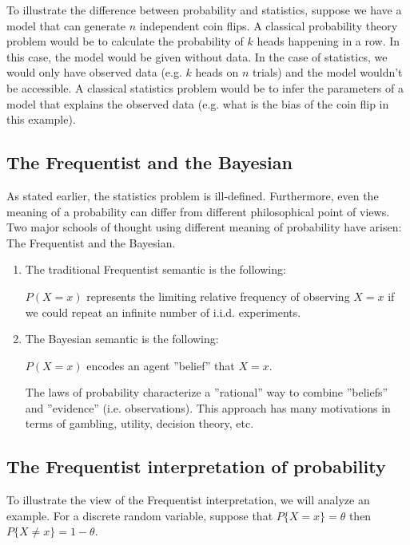 \documentclass[12pt]{report}
\renewcommand{\emph}[1]{\color{violet}#1\color{black}{}}
\begin{document}
To illustrate the difference between probability and statistics, suppose we have a model that can generate $ n $ independent coin flips. A classical probability theory problem would be to calculate the probability of $ k $ heads happening in a row. In this case, the model would be given without data. In the case of statistics, we would only have observed data (e.g. $ k $ heads on $ n $ trials) and the model wouldn't be accessible. A classical statistics problem would be to infer the parameters of a model that explains the observed data (e.g. what is the bias of the coin flip in this example).

\subsection{The Frequentist and the Bayesian}
As stated earlier, the statistics problem is ill-defined. Furthermore, even the meaning of a probability can differ from different philosophical point of views. Two major schools of thought using different meaning of probability have arisen: The Frequentist and the Bayesian.

\begin{enumerate}

  \item The \emph{traditional Frequentist} semantic is the following: 

$ P(X = x) $ represents the limiting relative frequency of observing $ X = x $ if we could repeat an infinite number of i.i.d. experiments.

  \item The \emph{Bayesian semantic} is the following:

$ P(X = x) $ encodes an agent ''belief'' that $ X = x $.

The laws of probability characterize a ''rational'' way to combine ''beliefs'' and ''evidence'' (i.e. observations). This approach has many motivations in terms of gambling, utility, decision theory, etc.

\end{enumerate}


\subsection{The Frequentist interpretation of probability}

To illustrate the view of the Frequentist interpretation, we will analyze an example.
For a discrete random variable, suppose that $ P\{X = x\} = \theta $ then $ P\{X \neq x\} = 1 - \theta $.
\end{document}
